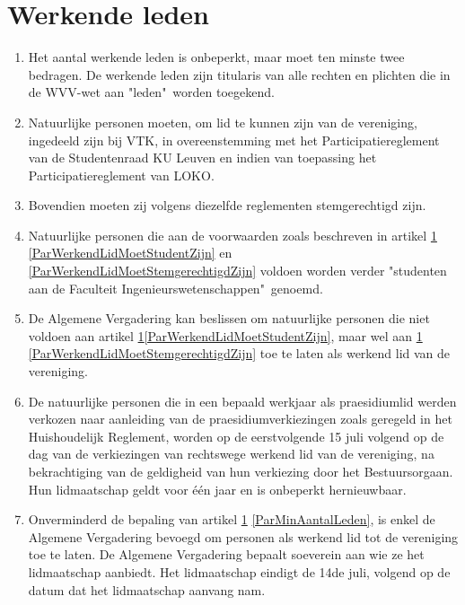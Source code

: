      \section{Werkende leden}\label{ArtikelWerkendeLeden}
    \begin{enumerate}
    \item Het aantal werkende leden is onbeperkt, maar moet ten minste twee bedragen. De werkende leden zijn titularis van alle rechten en plichten die in de WVV-wet aan "leden"\ worden toegekend.\label{ParMinAantalLeden}
    \item Natuurlijke personen moeten, om lid te kunnen zijn van de vereniging, ingedeeld zijn bij VTK, in overeenstemming met het Participatiereglement van de Studentenraad KU Leuven en indien van toepassing het Participatiereglement van LOKO.
    \label{ParWerkendLidMoetStudentZijn}
    \item Bovendien moeten zij volgens diezelfde reglementen stemgerechtigd zijn. \label{ParWerkendLidMoetStemgerechtigdZijn}
    \item Natuurlijke personen die aan de voorwaarden zoals beschreven in artikel \ref{ArtikelWerkendeLeden} \ref{ParWerkendLidMoetStudentZijn} en \ref{ParWerkendLidMoetStemgerechtigdZijn} voldoen worden verder "studenten aan de Faculteit Ingenieurswetenschappen"\ genoemd.
    \item De Algemene Vergadering kan beslissen om natuurlijke personen die niet voldoen aan artikel \ref{ArtikelWerkendeLeden}\ref{ParWerkendLidMoetStudentZijn}, maar wel aan \ref{ArtikelWerkendeLeden} \ref{ParWerkendLidMoetStemgerechtigdZijn} toe te laten als werkend lid van de vereniging.
    \item De natuurlijke personen die in een bepaald werkjaar als praesidiumlid werden verkozen naar aanleiding van de praesidiumverkiezingen zoals geregeld in het Huishoudelijk Reglement, worden op de eerstvolgende 15 juli volgend op de dag van de verkiezingen van rechtswege werkend lid van de vereniging, na bekrachtiging van de geldigheid van hun verkiezing door het Bestuursorgaan. Hun lidmaatschap geldt voor één jaar en is onbeperkt hernieuwbaar.
    \item Onverminderd de bepaling van artikel \ref{ArtikelWerkendeLeden} \ref{ParMinAantalLeden}, is enkel de Algemene Vergadering bevoegd om personen als werkend lid tot de vereniging toe te laten. De Algemene Vergadering bepaalt soeverein aan wie ze het lidmaatschap aanbiedt. Het lidmaatschap eindigt de 14de juli, volgend op de datum dat het lidmaatschap aanvang nam.

\end{enumerate}
